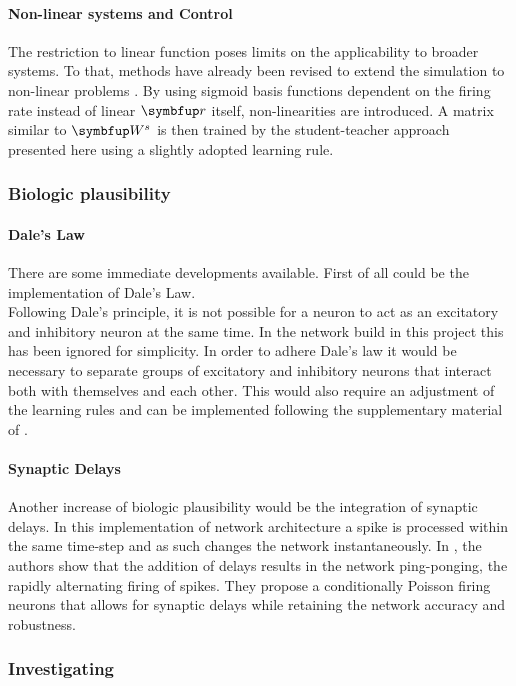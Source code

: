 \paragraph{Non-linear systems and Control}
The restriction to linear function poses limits on the applicability to broader systems. To that, methods have already been revised to extend the simulation to non-linear problems \cite{alemi_learning_2017}. By using sigmoid basis functions dependent on the firing rate instead of linear $\bmu{r}$ itself, non-linearities are introduced. A matrix similar to $\bmu{W}^s$ is then trained by the student-teacher approach presented here using a slightly adopted learning rule.


\subsubsection{Biologic plausibility}
\paragraph{Dale's Law}
There are some immediate developments available. First of all could be the implementation of Dale's Law.\\
Following Dale's principle, it is not possible for a neuron to act as an excitatory and inhibitory neuron at the same time. In the network build in this project this has been ignored for simplicity. In order to adhere Dale's law it would be necessary to separate groups of excitatory and inhibitory neurons that interact both with themselves and each other. This would also require an adjustment of the learning rules and can be implemented following the supplementary material of \cite{brendel_learning_2020}.\\
\paragraph{Synaptic Delays}
Another increase of biologic plausibility would be the integration of synaptic delays. In this implementation of network architecture a spike is processed within the same time-step and as such changes the network instantaneously.  In \cite{rullan_buxo_poisson_2020}, the authors show that the addition of delays results in the network ping-ponging, the rapidly alternating firing of spikes. They propose a conditionally Poisson firing neurons that allows for synaptic delays while retaining the network accuracy and robustness.\\

\subsubsection{Investigating}
